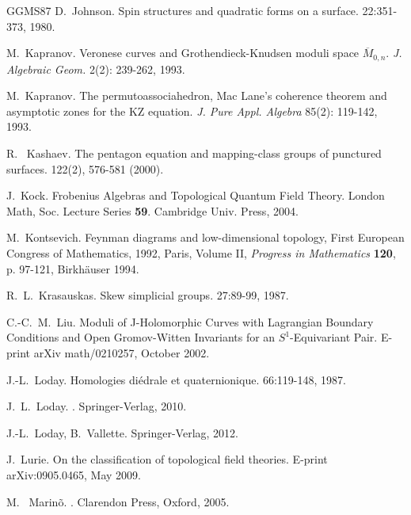 \documentclass[english,11pt,leqno]{article}
\theoremstyle{definition}
\theoremstyle{remark}
\numberwithin{equation}{section}
\begin{document}
\begin{thebibliography}{GGMS87}
 D.~Johnson.
\newblock Spin structures and quadratic forms on a surface.
 22:351-373, 1980. 


M.~Kapranov.
\newblock
 Veronese curves and Grothendieck-Knudsen moduli space 
 $\overline M_{0,n}$.
 \newblock
 {\em  J. Algebraic Geom.}  2(2): 239-262, 1993. 



M.~Kapranov.
\newblock
The permutoassociahedron, Mac Lane's coherence theorem and asymptotic zones for the KZ equation. 
\newblock
{\em J. Pure Appl. Algebra}  85(2): 119-142,   1993. 

 
R.~ Kashaev. 
\newblock
The pentagon equation and mapping-class groups of punctured surfaces.
 122(2), 576-581 (2000). 

 J.~Kock. 
\newblock
Frobenius Algebras and Topological Quantum Field Theory.
\newblock
London Math, Soc. Lecture Series {\bf 59}.
\newblock
Cambridge Univ. Press, 2004. 

M.~Kontsevich. 
\newblock
Feynman diagrams and low-dimensional topology, First European Congress of Mathematics, 1992, Paris, Volume II,
{\em  Progress in Mathematics}  {\bf 120}, p. 97-121, Birkh\"auser 1994. 

 R.~L.~Krasauskas.
\newblock Skew simplicial groups.
 27:89-99, 1987.

 C.-C.~M.~Liu. 
\newblock Moduli of J-Holomorphic Curves with Lagrangian Boundary 
Conditions and Open Gromov-Witten Invariants for an $S^1$-Equivariant Pair.
\newblock E-print arXiv math/0210257, October 2002. 

  
   J.-L.~Loday.
 \newblock Homologies di\'edrale et quaternionique.
  66:119-148, 1987.
 


 J.~L.~Loday. 
.
\newblock Springer-Verlag, 2010. 

  J.-L.~Loday, B.~Vallette.
 \newblock Springer-Verlag, 2012. 
 
  J.~Lurie.
 \newblock On the classification of topological field theories.
\newblock E-print arXiv:0905.0465, May 2009.  

  M.~ Marin\~o. 
 .
 \newblock Clarendon Press, Oxford, 2005. 
 

\end{thebibliography}
\end{document}
